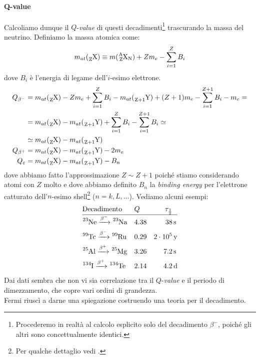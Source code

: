 \paragraph{Q-value}\label{sec-qvalue}
Calcoliamo dunque il $Q$-\textit{value} di questi decadimenti\footnote{Procederemo in realtà al calcolo esplicito solo del decadimento $\beta^-$, poiché gli altri sono concettualmente identici.} trascurando la massa del neutrino. Definiamo la massa atomica come:
$$m_{at} (\ce{_{Z}X}) \equiv m(\ce{^A_ZX_N})+Zm_e - \sum_{i=1}^Z B_i$$
dove $B_i$ è l'energia di legame dell'$i$-esimo elettrone.
\begin{displaymath}
\begin{aligned}
Q_{\beta^-} &= m_{at}(\ce{_ZX}) - Zm_e + \sum_{i=1}^Z B_i - m_{at}(\ce{_{Z+1}Y}) + (Z+1) m_e - \sum_{i=1}^{Z+1} B_i - m_e= \\
&= m_{at}(\ce{_ZX}) - m_{at}(\ce{_{Z+1}Y}) + \sum_{i=1}^Z B_i - \sum_{i=1}^{Z+1} B_i \simeq \\
&\simeq m_{at}(\ce{_ZX}) - m_{at}(\ce{_{Z+1}Y}) \\
Q_{\beta^+} &= m_{at}(\ce{_ZX}) - m_{at}(\ce{_{Z+1}Y}) - 2m_e \\
Q_{\varepsilon} &= m_{at}(\ce{_ZX}) - m_{at}(\ce{_{Z+1}Y}) - B_n
\end{aligned}
\end{displaymath}
dove abbiamo fatto l'approssimazione $Z\sim Z+1$ poiché stiamo considerando atomi con $Z$ molto  e dove abbiamo definito $B_n$ la \textit{binding energy} per l'elettrone catturato dell'$n$-esimo shell\footnote{Per qualche dettaglio vedi .} ($n = k,L,\dots$). Vediamo alcuni esempi:
\begin{displaymath}
\begin{aligned}
&\text{Decadimento} & &Q & \tau_{\frac{1}{2}}& \\
\hline
&\ce{^{23}Ne} \betamin \ce{^{23}Na} & &4.38 & 38&\,\mbox{s} \\
&\ce{^{99}Tc} \betamin \ce{^{99}Ru} & &0.29 & 2\cdot 10^5&\,\mbox{y} \\
&\ce{^{25}Al} \betaplu \ce{^{25}Mg} & &3.26 & 7.2&\,\mbox{s} \\
&\ce{^{134}I} \betaplu \ce{^{134}Te} & &2.14 & 4.2&\,\mbox{d} \\
\end{aligned}
\end{displaymath}
Dai dati sembra che non vi sia correlazione tra il $Q$-\textit{value} e il periodo di dimezzamento, che copre vari ordini di grandezza.\\
Fermi riuscì a darne una spiegazione costruendo una teoria per il decadimento.